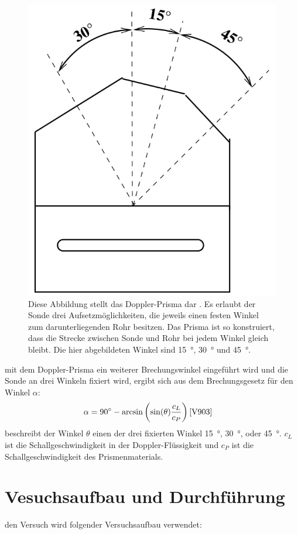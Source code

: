 \begin{figure}[H]
    \centering
    \includegraphics[width=0.35\linewidth]{images/Winkel.jpg}
    \caption{Diese Abbildung stellt das Doppler-Prisma dar \cite{V903}. Es erlaubt der Sonde drei Aufsetzmöglichkeiten, die jeweils einen festen Winkel zum darunterliegenden Rohr besitzen. Das
    Prisma ist so konstruiert, dass die Strecke zwischen Sonde und Rohr bei jedem Winkel gleich bleibt. Die hier abgebildeten Winkel sind \SI{15}{\degree}, \SI{30}{\degree} und \SI{45}{\degree}.}
    \label{fig:2}
\end{figure}

    \justifying mit dem Doppler-Prisma ein weiterer Brechungswinkel eingeführt wird und die Sonde an drei Winkeln fixiert wird, ergibt sich aus dem Brechungsgesetz
    für den Winkel $\alpha$: 
    \begin{align}
        \alpha &= \text{\SI{90}{\degree}} - \arcsin\left( \sin(\theta) \frac{c_L}{c_P} \right) \label{eq:4} \text{\cite{V903}}
    \end{align}
    \justifying beschreibt der Winkel $\theta$ einen der drei fixierten Winkel \SI{15}{\degree}, \SI{30}{\degree}, oder \SI{45}{\degree}. $c_L$ ist die Schallgeschwindigkeit
    in der Doppler-Flüssigkeit und $c_P$ ist die Schallgeschwindigkeit des Prismenmaterials.

\newpage
\section{Vesuchsaufbau und Durchführung}

    \justifying den Versuch wird folgender Versuchsaufbau verwendet:

